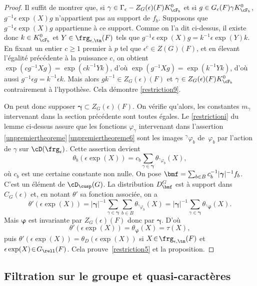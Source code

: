 \begin{proof}
Il suffit de montrer que, si $\gamma\in \Gamma_{\epsilon}-Z_{G}(\epsilon)(F)K_{\cF_{b}}^0$ et si $g\in G_{\epsilon}(F)\gamma K_{\cF_{b}}^0$, $g^{-1}\epsilon \exp(X) g$ n'appartient pas au support de $f_{b}$. Supposons que $g^{-1}\epsilon \exp(X) g$ appartienne à ce support. Comme on l'a dit ci-dessus, il existe donc $k\in K_{\cF_{b}}^0$ et $Y\in \frg_{\epsilon,\tn}(F)$ tels que $g^{-1}\epsilon \exp(X)g=k^{-1}\epsilon \exp(Y)k$. En fixant un entier $c\geq1$ premier à $p$ tel que $\epsilon^c\in Z(G)(F)$, et en élevant l'égalité précédente à la puissance $c$, on obtient
$\exp(cg^{-1}Xg)=\exp(ck^{-1}Yk)$, d'où $\exp(g^{-1}Xg)=\exp(k^{-1}Yk)$, d'où aussi $g^{-1}\epsilon g=k^{-1} \epsilon k$. Mais alors $gk^{-1}\in Z_{G}(\epsilon)(F)$ et $\gamma\in Z_{G}(\epsilon)(F)K_{\cF_{b}}^0 $ contrairement à l'hypothèse. Cela démontre \eqref{restriction9}.

On peut donc supposer $\boldsymbol{\gamma}\subset Z_{G}(\epsilon)(F)$. On vérifie qu'alors, les constantes $m_{\gamma}$ intervenant dans la section précédente sont toutes égales. Le \eqref{restrictioni} du lemme ci-dessus assure que les fonctions $\varphi_{\gamma}$ intervenant dans l'assertion \ref{unpremiertheoreme}\,\eqref{unpremiertheoreme6} sont les images $^{\gamma}\varphi_{b}$ de~$\varphi_{b}$ par l'action de $\gamma$ sur $\cD(\frg_{\epsilon})$. Cette assertion
devient
\[
\theta_{b}(\epsilon \exp(X))=c_{b} \sum_{\gamma\in \boldsymbol{\gamma}}
\theta_{^{\gamma}\varphi_{b}}(X),
\]
où $c_{b}$ est une certaine constante non nulle.
On pose $\bmf=\sum_{b\in B}c_{b}^{-1}\vert \boldsymbol{\gamma}\vert^{-1} f_{b}$. C'est un élément de $\cD_{\cusp}(G)$.
La distribution $D^G_{\bmf}$ est à support dans $C_{G}(\epsilon)$ et, en notant $\theta'$ sa fonction associée, on a
\[
\theta'(\epsilon \exp(X))= \vert \boldsymbol{\gamma}\vert ^{-1}\sum_{\gamma\in \boldsymbol{\gamma}}\sum_{b\in B}\theta_{^{\gamma}\varphi_{b}}(X)=\vert \boldsymbol{\gamma}\vert ^{-1}\sum_{\gamma\in \boldsymbol{\gamma}}\theta_{^{\gamma}\boldsymbol{\varphi}}(X).
\]
Mais $\boldsymbol{\varphi}$ est invariante par $Z_{G}(\epsilon)(F)$ donc par $\boldsymbol{\gamma}$. D'où
\[
\theta'(\epsilon \exp(X))=\theta_{\boldsymbol{\varphi}}(X)=\tau(X),
\]
puis $\theta'(\epsilon \exp(X))\!=\!\theta_{D}(\epsilon \exp(X))$ si $X\!\in\!\frg_{\epsilon,\tn}(F)$ et $\epsilon \exp(X)\!\in\!G_{\rell}(F)$. Cela prouve~\eqref{restriction5} et la proposition.
\end{proof}

\subsection{Filtration sur le groupe et quasi-caractères}\label{filtrationsurlegroupe}

